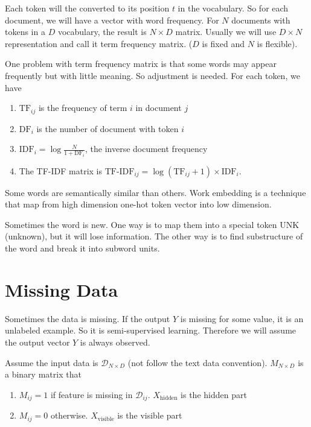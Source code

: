 \begin{definition}
    Each token will the converted to its position $t$ in the vocabulary. So for each document, we will have a vector with word frequency. For $N$ documents with tokens in a $D$ vocabulary, the result is $N \times D$ matrix. Usually we will use $D \times N$ representation and call it term frequency matrix. ($D$ is fixed and $N$ is flexible).
    
    
One problem with term frequency matrix is that some words may appear frequently but with little meaning. So adjustment is needed. For each token, we have
\begin{enumerate}
    \item $\text{TF}_{ij}$ is the frequency of term $i$ in document $j$
    \item $\text{DF}_i$ is the number of document with token $i$
    \item $\displaystyle \text{IDF}_i = \log \frac{N}{1 + \text{DF}_i}$, the inverse document frequency
    \item The TF-IDF matrix is $\text{TF-IDF}_{ij} = \log(\text{TF}_{ij} + 1) \times \text{IDF}_i$.
\end{enumerate}

\end{definition}

\begin{definition}
    Some words are semantically similar than others. Work embedding is a technique that map from high dimension one-hot token vector into low dimension.
\end{definition}

\begin{example}
    Sometimes the word is new. One way is to map them into a special token UNK (unknown), but it will lose information. The other way is to find substructure of the word and break it into subword units.
\end{example}



\section{Missing Data}

Sometimes the data is missing. If the output $Y$ is missing for some value, it is an unlabeled example. So it is semi-supervised learning. Therefore we will assume the output vector $Y$ is always observed.

Assume the input data is $\mathcal{D}_{N \times D}$ (not follow the text data convention). $M_{N \times D}$ is a binary matrix that
\begin{enumerate}
    \item $M_{ij} = 1$ if feature is missing in $\mathcal{D}_{ij}$. $X_{\text{hidden}}$ is the hidden part
    \item $M_{ij} = 0$ otherwise. $X_{\text{visible}}$ is the visible part
\end{enumerate}

